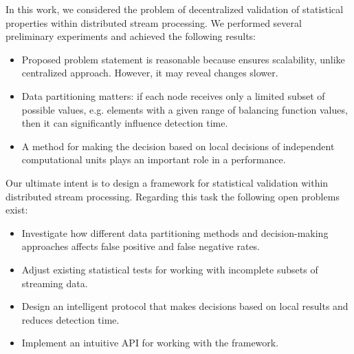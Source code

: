 \label {fs-short-conclusion}

In this work, we considered the problem of decentralized validation of statistical properties within distributed stream processing. We performed several preliminary experiments and achieved the following results:
\begin{itemize}
    \item Proposed problem statement is reasonable because ensures scalability, unlike centralized approach. However, it may reveal changes slower.
    \item Data partitioning matters: if each node receives only a limited subset of possible values, e.g. elements with a given range of balancing function values, then it can significantly influence detection time.
    \item A method for making the decision based on local decisions of independent computational units plays an important role in a performance.
\end{itemize}

Our ultimate intent is to design a framework for statistical validation within distributed stream processing. Regarding this task the following open problems exist:

\begin{itemize}
    \item Investigate how different data partitioning methods and decision-making approaches affects false positive and false negative rates.
    \item Adjust existing statistical tests for working with incomplete subsets of streaming data.
    \item Design an intelligent protocol that makes decisions based on local results and reduces detection time.
    \item Implement an intuitive API for working with the framework.
\end{itemize}